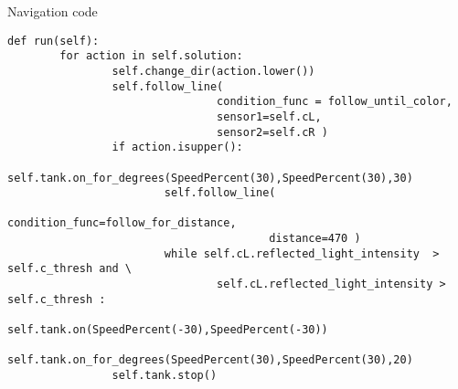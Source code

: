 \documentclass[../../main.tex]{subfiles}
\begin{document}
\begin{listing}
	\caption{Navigation code}	
	\label{lst:nav}
	\begin{verbatim}
def run(self):
		for action in self.solution:
				self.change_dir(action.lower())
				self.follow_line(
								condition_func = follow_until_color,
								sensor1=self.cL,
								sensor2=self.cR )
				if action.isupper():
						self.tank.on_for_degrees(SpeedPercent(30),SpeedPercent(30),30)
						self.follow_line(
										condition_func=follow_for_distance,
										distance=470 )
						while self.cL.reflected_light_intensity  > self.c_thresh and \
								self.cL.reflected_light_intensity > self.c_thresh :
								self.tank.on(SpeedPercent(-30),SpeedPercent(-30))
						self.tank.on_for_degrees(SpeedPercent(30),SpeedPercent(30),20)
				self.tank.stop()
	\end{verbatim}
\end{listing}




	
\end{document}
